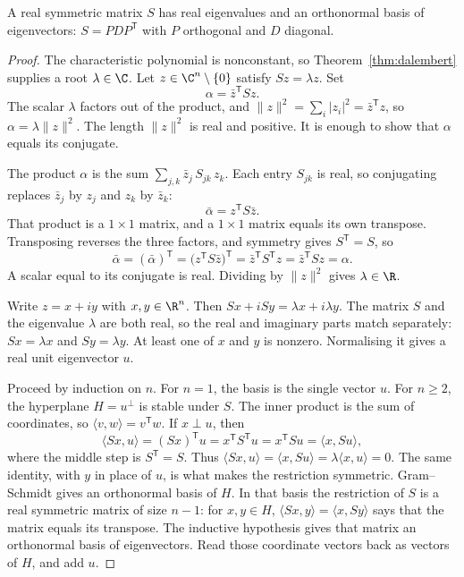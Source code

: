 \begin{theorem}\label{thm:spectral}
A real symmetric matrix $S$ has real eigenvalues and an orthonormal basis of eigenvectors: $S=PDP^{\mathsf T}$ with $P$ orthogonal and $D$ diagonal.
\end{theorem}
\begin{proof}
The characteristic polynomial is nonconstant, so Theorem~\ref{thm:dalembert} supplies a root $\lambda\in\C$. Let $z\in\C^n\setminus\{0\}$ satisfy $Sz=\lambda z$. Set
\[
\alpha=\bar z^{\mathsf T}Sz.
\]
The scalar $\lambda$ factors out of the product, and $\|z\|^2=\sum_i|z_i|^2=\bar z^{\mathsf T}z$, so $\alpha=\lambda\|z\|^2$. The length $\|z\|^2$ is real and positive. It is enough to show that $\alpha$ equals its conjugate.

The product $\alpha$ is the sum $\sum_{j,k}\bar z_j\,S_{jk}\,z_k$. Each entry $S_{jk}$ is real, so conjugating replaces $\bar z_j$ by $z_j$ and $z_k$ by $\bar z_k$:
\[
\bar\alpha=z^{\mathsf T}S\bar z.
\]
That product is a $1\times1$ matrix, and a $1\times1$ matrix equals its own transpose. Transposing reverses the three factors, and symmetry gives $S^{\mathsf T}=S$, so
\[
\bar\alpha=(\bar\alpha)^{\mathsf T}=\bigl(z^{\mathsf T}S\bar z\bigr)^{\mathsf T}=\bar z^{\mathsf T}S^{\mathsf T}z=\bar z^{\mathsf T}Sz=\alpha.
\]
A scalar equal to its conjugate is real. Dividing by $\|z\|^2$ gives $\lambda\in\R$.

Write $z=x+iy$ with $x,y\in\R^n$. Then $Sx+iSy=\lambda x+i\lambda y$. The matrix $S$ and the eigenvalue $\lambda$ are both real, so the real and imaginary parts match separately: $Sx=\lambda x$ and $Sy=\lambda y$. At least one of $x$ and $y$ is nonzero. Normalising it gives a real unit eigenvector $u$.

Proceed by induction on $n$. For $n=1$, the basis is the single vector $u$. For $n\ge2$, the hyperplane $H=u^\perp$ is stable under $S$. The inner product is the sum of coordinates, so $\langle v,w\rangle=v^{\mathsf T}w$. If $x\perp u$, then
\[
\langle Sx,u\rangle=(Sx)^{\mathsf T}u=x^{\mathsf T}S^{\mathsf T}u=x^{\mathsf T}Su=\langle x,Su\rangle,
\]
where the middle step is $S^{\mathsf T}=S$. Thus $\langle Sx,u\rangle=\langle x,Su\rangle=\lambda\langle x,u\rangle=0$. The same identity, with $y$ in place of $u$, is what makes the restriction symmetric. Gram--Schmidt gives an orthonormal basis of $H$. In that basis the restriction of $S$ is a real symmetric matrix of size $n-1$: for $x,y\in H$, $\langle Sx,y\rangle=\langle x,Sy\rangle$ says that the matrix equals its transpose. The inductive hypothesis gives that matrix an orthonormal basis of eigenvectors. Read those coordinate vectors back as vectors of $H$, and add $u$.
\end{proof}

